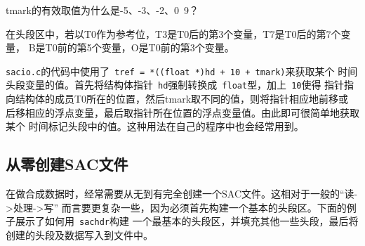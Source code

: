 \begin{note}
tmark的有效取值为什么是-5、-3、-2、0~9？

在头段区中，若以T0作为参考位，T3是T0后的第3个变量，T7是T0后的第7个变量，
B是T0前的第5个变量，O是T0前的第3个变量。

\verb+sacio.c+的代码中使用了~\verb|tref = *((float *)hd + 10 + tmark)|来获取某个
时间头段变量的值。首先将结构体指针~\verb+hd+强制转换成~\verb+float+型，加上~\verb+10+使得
指针指向结构体的成员T0所在的位置，然后tmark取不同的值，则将指针相应地前移或
后移相应的浮点变量，最后取指针所在位置的浮点变量值。由此即可很简单地获取某个
时间标记头段中的值。这种用法在自己的程序中也会经常用到。
\end{note}

\subsection{从零创建SAC文件}
在做合成数据时，经常需要从无到有完全创建一个SAC文件。这相对于一般的“读->处理->写”
而言要更复杂一些，因为必须首先构建一个基本的头段区。下面的例子展示了如何用~\verb+sachdr+构建
一个最基本的头段区，并填充其他一些头段，最后将创建的头段及数据写入到文件中。
\inputminted{C}{./sacio/write_sac.c}
